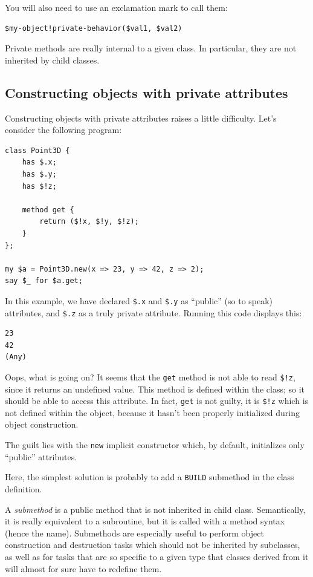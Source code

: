 You will also need to use an exclamation mark to call them:

\begin{verbatim}
$my-object!private-behavior($val1, $val2)
\end{verbatim}

Private methods are really internal to a given class. In 
particular, they are not inherited by child classes.


\subsection{Constructing objects with private attributes}

Constructing objects with private attributes raises a 
little difficulty. Let's consider the following program:

\begin{verbatim}
class Point3D {
    has $.x;
    has $.y;
    has $!z;
    
    method get {
        return ($!x, $!y, $!z);
    }
};

my $a = Point3D.new(x => 23, y => 42, z => 2);
say $_ for $a.get;
\end{verbatim}

In this example, we have declared \verb'$.x' and \verb'$.y' 
as ``public'' (so to speak) attributes, and \verb'$.z' as 
a truly private attribute. Running this code displays this:

\begin{verbatim}
23
42
(Any)
\end{verbatim}

Oops, what is going on? It seems that the {\tt get} 
method is not able to read \verb'$!z', since it returns 
an undefined value. This method is defined within the 
class; so it should be able to access this attribute. In 
fact, {\tt get} is not guilty, it is \verb'$!z' which is 
not defined within the object, because it hasn't been properly 
initialized during object construction.

The guilt lies with the {\tt new} implicit constructor which, 
by default, initializes only ``public'' attributes.

Here, the simplest solution is probably to add a {\tt BUILD} 
submethod in the class definition.

A \emph{submethod} is a public method that is not inherited 
in child class. Semantically, it is really equivalent 
to a subroutine, but it is called with a method syntax (hence 
the name). Submethods are especially useful to perform object 
construction and destruction tasks which should not be 
inherited by subclasses, as well as for tasks that are 
so specific to a given type that classes derived from it  
will almost for sure have to redefine them.

